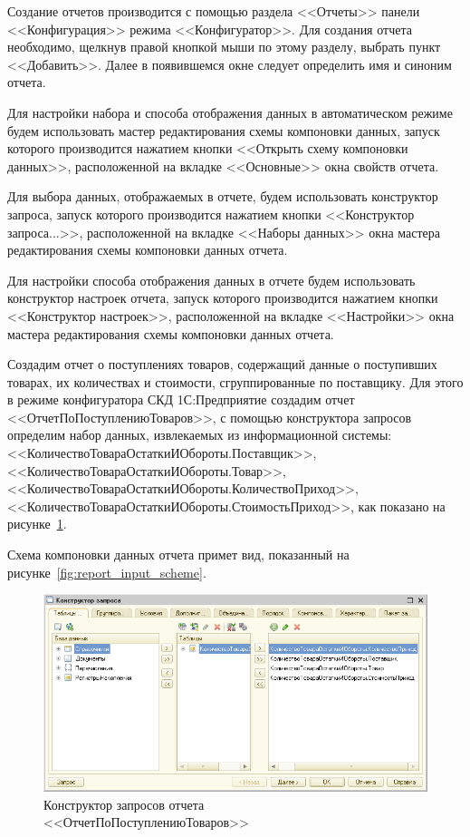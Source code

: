 Создание отчетов производится с помощью раздела
<<Отчеты>> панели <<Конфигурация>> режима <<Конфигуратор>>.
Для создания отчета необходимо,
щелкнув правой кнопкой мыши по этому
разделу, выбрать пункт <<Добавить>>. Далее в появившемся окне
следует определить имя и синоним отчета.

Для настройки набора и способа отображения данных в
автоматическом режиме будем использовать
мастер редактирования схемы компоновки данных,
запуск которого производится нажатием кнопки
<<Открыть схему компоновки данных>>, расположенной
на вкладке <<Основные>> окна свойств отчета.

Для выбора данных, отображаемых в отчете, будем использовать
конструктор запроса, запуск которого производится нажатием кнопки
<<Конструктор запроса...>>, расположенной
на вкладке <<Наборы данных>> окна
мастера редактирования схемы компоновки данных отчета.

Для настройки способа отображения данных в отчете будем использовать
конструктор настроек отчета, запуск которого производится нажатием кнопки
<<Конструктор настроек>>, расположенной
на вкладке <<Настройки>> окна
мастера редактирования схемы компоновки данных отчета.

Создадим отчет о поступлениях товаров,
содержащий данные о поступивших товарах, их количествах и стоимости,
сгруппированные по поставщику.
Для этого в режиме конфигуратора СКД 1С:Предприятие создадим отчет
<<ОтчетПоПоступлениюТоваров>>, с помощью конструктора запросов
определим набор данных, извлекаемых из информационной системы:
<<КоличествоТовараОстаткиИОбороты.Поставщик>>,
<<КоличествоТовараОстаткиИОбороты.Товар>>,
<<КоличествоТовараОстаткиИОбороты.КоличествоПриход>>,
<<КоличествоТовараОстаткиИОбороты.СтоимостьПриход>>,
как показано на рисунке~\ref{fig:report_input_query}.

Схема компоновки данных отчета примет вид,
показанный на рисунке~\ref{fig:report_input_scheme}.

\pagebreak

\begin{figure}[h!]
  \centering
  \includegraphics[width=150mm]{pic/report_input_query}
  \caption{Конструктор запросов отчета \\ <<ОтчетПоПоступлениюТоваров>>}
  \label{fig:report_input_query}
\end{figure}

